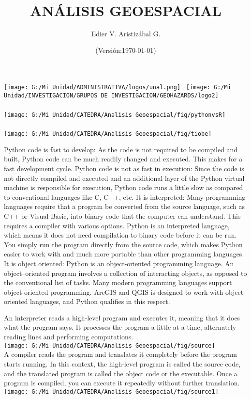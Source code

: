 \documentclass[12pt]{beamer}
\title[Ambiente de Trabajo]{ANÁLISIS GEOESPACIAL}
\author[Edier Aristizábal]{Edier V. Aristizábal G.}
\institute{\emph{evaristizabalg@unal.edu.co}}
\date{(Versión:\today)}
\begin{document}
\begin{frame}
\titlepage
\centering
	\texttt{[image: G:/Mi Unidad/ADMINISTRATIVA/logos/unal.png]}\hspace*{4.75cm}~%
   	\texttt{[image: G:/Mi Unidad/INVESTIGACION/GRUPOS DE INVESTIGACION/GEOHAZARDS/logo2]} 
\end{frame}
\begin{frame}
\frametitle{}
\centering
	\texttt{[image: G:/Mi Unidad/CATEDRA/Analisis Geoespacial/fig/pythonvsR]} 
\end{frame}
\begin{frame}
\frametitle{}
\centering
	\texttt{[image: G:/Mi Unidad/CATEDRA/Analisis Geoespacial/fig/tiobe]} 
\end{frame}
\begin{frame}
\scriptsize {
\alert{Python code is fast to develop}: As the code is not required to be compiled and built, Python code can be much readily changed and executed. This makes for a fast development cycle.\vfill
\alert{Python code is not as fast in execution}: Since the code is not directly compiled and executed and an additional layer of the Python virtual machine is responsible for execution, Python code runs a little slow as compared to conventional languages like C, C++, etc.\vfill
\alert{It is interpreted}: Many programming languages require that a program be converted from the source language, such as C++ or Visual Basic, into binary code that the computer can understand. This requires a compiler with various options. Python is an interpreted language, which means it does not need compilation to binary code before it can be run. You simply run the program directly from the source code, which makes Python easier to work with and much more portable than other programming languages.\vfill
\alert{It is object oriented}: Python is an object-oriented programming language. An object--oriented program involves a collection of interacting objects, as opposed to the conventional list of tasks. Many modern programming languages support object-oriented programming. ArcGIS and QGIS is designed to work with object-oriented languages, and Python qualifies in this respect.
}
\end{frame} 
\begin{frame}
\scriptsize{\alert{An interpreter} reads a high-level program and executes it, meaning that it does what the program says. It processes the program a little at a time, alternately reading lines and performing computations.}\\
\texttt{[image: G:/Mi Unidad/CATEDRA/Analisis Geoespacial/fig/source]}\\
\vfill
\scriptsize{\alert{A compiler} reads the program and translates it completely before the program starts running.
In this context, the high-level program is called the source code, and the translated program is called the object code or the executable. Once a program is compiled, you can execute it repeatedly without further translation.} 
\texttt{[image: G:/Mi Unidad/CATEDRA/Analisis Geoespacial/fig/source1]}
\end{frame} 
\end{document}

